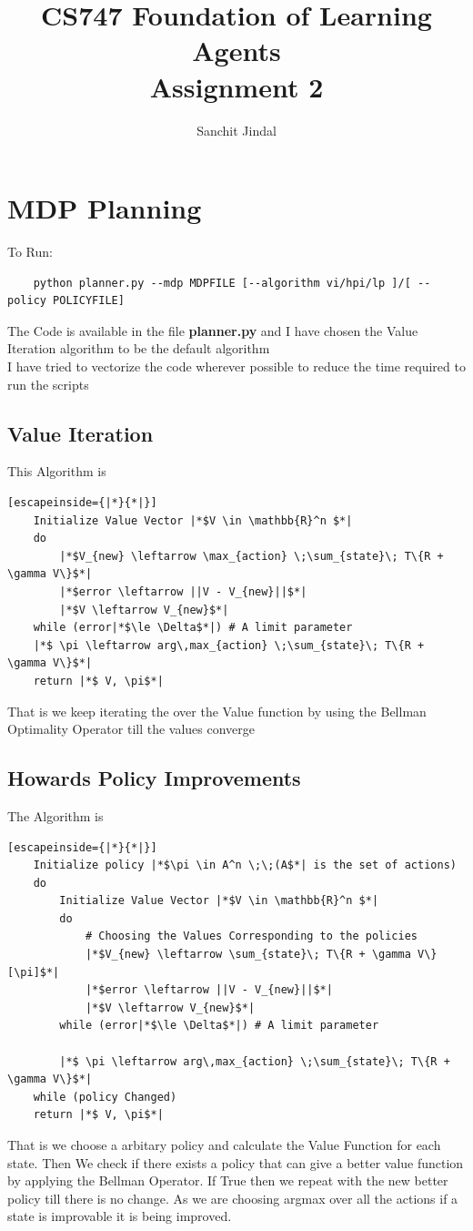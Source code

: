 \documentclass[10pt]{article}
\title{CS747 Foundation of Learning Agents \\ Assignment 2}
\author{Sanchit Jindal \quad 200020120}
\date{}
\begin{document}
\maketitle

\section{MDP Planning}

To Run:
\begin{verbatim}
    python planner.py --mdp MDPFILE [--algorithm vi/hpi/lp ]/[ --policy POLICYFILE]
\end{verbatim}

\noindent
The Code is available in the file \textbf{planner.py} and I have chosen the Value Iteration algorithm to be the default algorithm \\
I have tried to vectorize the code wherever possible to reduce the time required to run the scripts

\subsection{Value Iteration}
This Algorithm is 
\begin{lstlisting}[escapeinside={|*}{*|}]
    Initialize Value Vector |*$V \in \mathbb{R}^n $*|
    do
        |*$V_{new} \leftarrow \max_{action} \;\sum_{state}\; T\{R + \gamma V\}$*|
        |*$error \leftarrow ||V - V_{new}||$*|
        |*$V \leftarrow V_{new}$*|
    while (error|*$\le \Delta$*|) # A limit parameter
    |*$ \pi \leftarrow arg\,max_{action} \;\sum_{state}\; T\{R + \gamma V\}$*|
    return |*$ V, \pi$*| 
\end{lstlisting}

That is we keep iterating the over the Value function by using the Bellman Optimality Operator till the values converge

\subsection{Howards Policy Improvements}
The Algorithm is 
\begin{lstlisting}[escapeinside={|*}{*|}]
    Initialize policy |*$\pi \in A^n \;\;(A$*| is the set of actions)
    do 
        Initialize Value Vector |*$V \in \mathbb{R}^n $*|
        do
            # Choosing the Values Corresponding to the policies
            |*$V_{new} \leftarrow \sum_{state}\; T\{R + \gamma V\} [\pi]$*|
            |*$error \leftarrow ||V - V_{new}||$*|
            |*$V \leftarrow V_{new}$*|
        while (error|*$\le \Delta$*|) # A limit parameter
    
        |*$ \pi \leftarrow arg\,max_{action} \;\sum_{state}\; T\{R + \gamma V\}$*|
    while (policy Changed)
    return |*$ V, \pi$*| 
\end{lstlisting}
That is we choose a arbitary policy and calculate the Value Function for each state.
Then We check if there exists a policy that can give a better value function by applying the Bellman Operator.
If True then we repeat with the new better policy till there is no change. 
As we are choosing argmax over all the actions if a state is improvable it is being improved.
\end{document}

